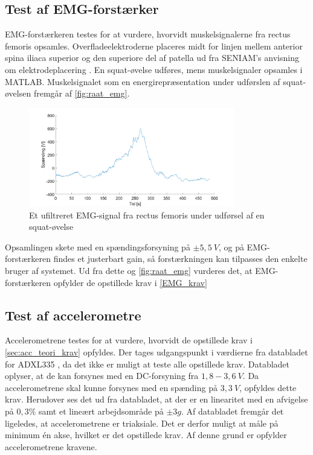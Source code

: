 \subsection{Test af EMG-forstærker}

EMG-forstærkeren testes for at vurdere, hvorvidt muskelsignalerne fra rectus femoris opsamles. Overfladeelektroderne placeres midt for linjen mellem anterior spina iliaca superior og den superiore del af patella ud fra SENIAM's anvisning om elektrodeplacering \citep{seniam2016}. En squat-øvelse udføres, mens muskelsignaler opsamles i MATLAB. Muskelsignalet som en energirepræsentation under udførslen af squat-øvelsen fremgår af \autoref{fig:raat_emg}. 

\begin{figure}[H]
\centering
\includegraphics[width=0.8\textwidth]{figures/raat_EMG_test}
\caption{Et ufiltreret EMG-signal fra rectus femoris under udførsel af en squat-øvelse}
\label{fig:raat_emg}
\end{figure}

Opsamlingen skete med en spændingsforsyning på $\pm5,5~V$, og på EMG-forstærkeren findes et justerbart gain, så forstærkningen kan tilpasses den enkelte bruger af systemet. Ud fra dette og \autoref{fig:raat_emg} vurderes det, at EMG-forstærkeren opfylder de opstillede krav i \autoref{EMG_krav}

\subsection{Test af accelerometre}

Accelerometrene testes for at vurdere, hvorvidt de opstillede krav i \autoref{sec:acc_teori_krav} opfyldes. Der tages udgangspunkt i værdierne fra databladet for ADXL335 \citep{analogdevices2010}, da det ikke er muligt at teste alle opstillede krav. Databladet oplyser, at de kan forsynes med en DC-forsyning fra $1,8-3,6~V$. Da accelerometrene skal kunne forsynes med en spænding på $3,3~V$, opfyldes dette krav. Herudover ses det ud fra databladet, at der er en linearitet med en afvigelse på $0,3\%$ samt et lineært arbejdsområde på $ \pm 3 g$. Af databladet fremgår det ligeledes, at accelerometrene er triaksiale. Det er derfor muligt at måle på minimum én akse, hvilket er det opstillede krav. Af denne grund er opfylder accelerometrene kravene.  

